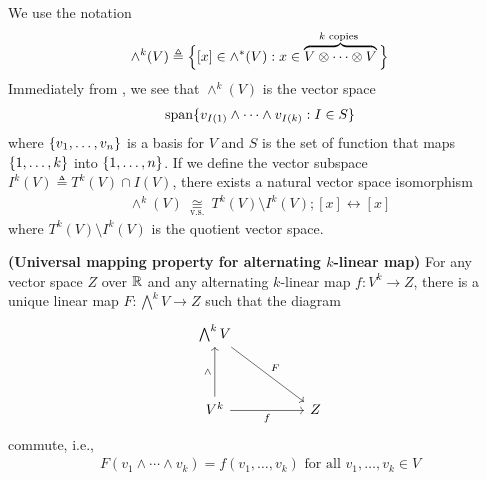 \documentclass{report}
\begin{document}
\begin{mdframed}
We use the notation 
\begin{align*}
\wedge^k(V) \triangleq \Big\{  [x] \in \wedge ^*(V): x \in \overbrace{V \otimes  \cdots \otimes  V}^{k\text{ copies }} \Big\} 
\end{align*}
Immediately from , we see that $\wedge ^k (V) $ is the vector space 
\begin{align*}
\operatorname{span}\{ v_{I(1)}\wedge  \cdots \wedge  v_{I(k)}:I \in S   \}
\end{align*}
where $\{ v_1,\dots ,v_n \}$ is a basis for $V$ and $S$ is the set of function that maps  $\{ 1,\dots ,k \}$ into $\{ 1,\dots ,n \}$. If we define the vector subspace $I^k(V)\triangleq T^k(V)\cap I(V)$, there exists a natural vector space isomorphism
\begin{align*}
\wedge  ^k(V)\underset{\text{ v.s. }}{\cong }T^k(V)\setminus I^k(V);[x]\leftrightarrow [x]
\end{align*}
where $T^k(V)\setminus I^k(V)$ is the quotient vector space.
\end{mdframed}
\begin{theorem}
\label{Universal mapping property for alternating $k$-linear map}
\textbf{(Universal mapping property for alternating $k$-linear map)} For any vector space $Z$ over  $\mathbb{R}$ and any alternating  $k$-linear map  $f:V^k\rightarrow Z$, there is a unique linear map $F:\bigwedge ^k V\rightarrow Z $ such that the diagram 
\[\begin{tikzcd}
	{\bigwedge^k V } \\
	\\
	{V^k} && Z
	\arrow["F", from=1-1, to=3-3]
	\arrow["{\wedge }", from=3-1, to=1-1]
	\arrow["f"', from=3-1, to=3-3]
\end{tikzcd}\]
commute, i.e., 
\begin{align*}
F(v_1\wedge \cdots \wedge  v_k  )=f(v_1,\dots ,v_k) \text{ for all }v_1,\dots,v_k \in V
\end{align*}
\end{theorem}
\end{document}
